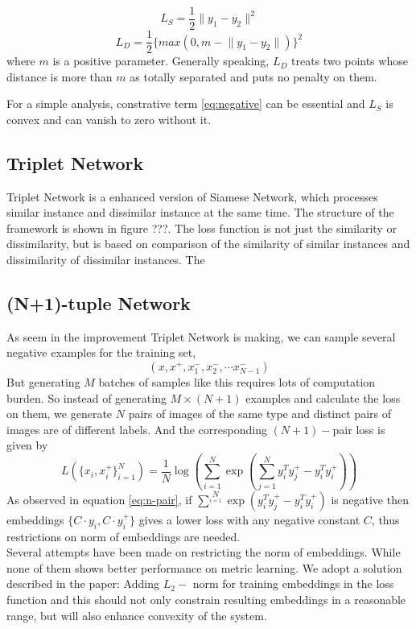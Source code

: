 \documentclass[10pt,twocolumn,letterpaper]{article}
\begin{document}
			\begin{equation}
				L_S = \frac{1}{2}\lVert y_1 - y_2 \rVert^2
			\end{equation}
			\begin{equation}
				L_D = \frac{1}{2}\{max(0, m-\lVert y_1-y_2\rVert)\}^2 \label{eq:negative}
			\end{equation}
			where $m$ is a positive parameter. Generally speaking, $L_D$ treats two points whose distance is more than $m$ as totally separated and puts no penalty on them.
			
			For a simple analysis, constrative term \ref{eq:negative} can be essential and $L_S$ is convex and can vanish to zero without it.
		\subsection{Triplet Network}
			Triplet Network is a enhanced version of Siamese Network, which processes similar instance and dissimilar instance at the same time. The structure of the framework is shown in figure ???. The loss function is not just the similarity or dissimilarity, but is based on comparison of the similarity of similar instances and dissimilarity of dissimilar instances. The 

		\subsection{(N+1)-tuple Network}
			As seem in the improvement Triplet Network is making, we can sample several negative examples for the training set, 
			$$(x,x^+,x^-_1,x^-_2,\cdots x^-_{N-1})$$
			But generating $M$ batches of samples like this requires lots of computation burden. So instead of generating $M\times(N+1)$ examples and calculate the loss on them, we generate $N$ pairs of images of the same type and distinct pairs of images are of different labels. And the corresponding $(N+1)-$pair loss is given by 
			\begin{equation}
				L(\{x_i,x_i^+\}^N_{i=1})=\frac{1}{N}\log(\sum_{i=1}^N\exp(\sum_{j=1}^Ny^T_iy_j^+-y_i^Ty_i^+))  \label{eq:n-pair}
			\end{equation}
			As observed in equation \ref{eq:n-pair}, if $\sum^N\limits_{i=1}\exp(y^T_iy_j^+-y_i^Ty_i^+)$ is negative then embeddings $\{C\cdot y_i,C\cdot y_i^+\}$ gives a lower loss with any negative constant $C$, thus restrictions on norm of embeddings are needed.\\
			Several attempts have been made on restricting the norm of embeddings. While none of them shows better performance on metric learning. We adopt a solution described in the paper: Adding $L_2-$ norm for training embeddings in the loss function and this should not only constrain resulting embeddings in a reasonable range, but will also enhance convexity of the system.
\end{document}
